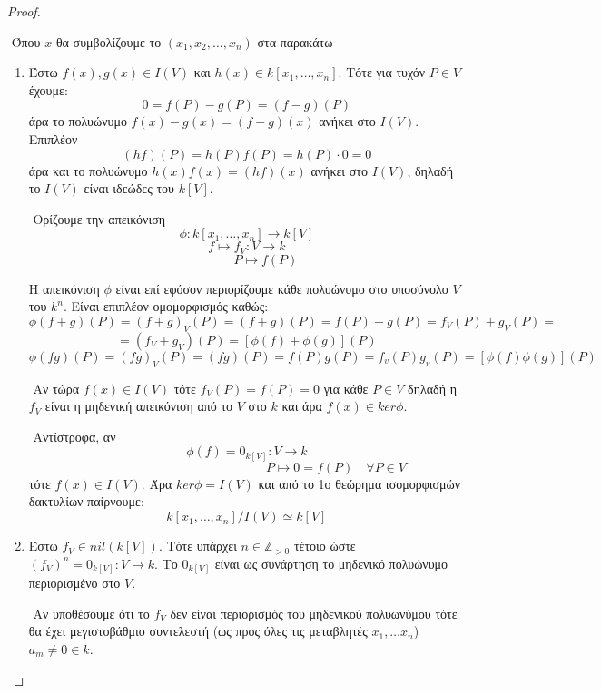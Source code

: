 \documentclass[oneside,a4paper]{article}
\newcommand{\Z}{\mathbb{Z}}
\begin{document}
\begin{proof} $ $
	
	$ $\newline
	Όπου $x$ θα συμβολίζουμε το $(x_1, x_2, \ldots, x_n)$ στα παρακάτω
	\begin{enumerate}
		\item Έστω $f(x),g(x) \in I(V)$ και $h(x) \in k[x_1,\ldots ,x_n]$. Τότε για τυχόν $P \in V$ έχουμε:
		$$0 = f(P) - g(P) = (f-g)(P)$$
		άρα το πολυώνυμο $f(x)-g(x) = (f-g)(x)$ ανήκει στο $I(V)$. Επιπλέον
		$$(hf)(P) = h(P)f(P) = h(P)\cdot 0 = 0$$
		άρα και το πολυώνυμο $h(x)f(x) = (hf)(x)$ ανήκει στο $I(V)$, δηλαδή το $I(V)$ είναι ιδεώδες του $k[V]$.

		$ $\newline
		Ορίζουμε την απεικόνιση
		$$\phi : k[x_1, \ldots, x_n] \longrightarrow k[V]$$
		$$f \longmapsto f_V:V\rightarrow k$$
		$$\quad \quad \quad P\mapsto f(P)$$

		Η απεικόνιση $\phi$ είναι επί εφόσον περιορίζουμε κάθε πολυώνυμο στο υποσύνολο $V$ του $k^n$. Είναι επιπλέον ομομορφισμός καθώς:
		$$\phi(f+g)(P) = (f+g)_V (P) = (f+g)(P) = f(P) + g(P) = f_V (P) + g_V (P) =$$
		$$ = (f_V + g_V) (P) = [\phi(f) + \phi(g)](P)$$
		$$\phi(fg) (P)= (fg)_V (P) = (fg)(P) = f(P)g(P) = f_v(P) g_v(P) = [\phi(f)\phi(g)](P)$$
		
		$ $\newline
		Αν τώρα $f(x) \in I(V)$ τότε $f_V (P) = f(P) = 0$ για κάθε $P \in V$ δηλαδή η $f_V$ είναι η μηδενική απεικόνιση από το $V$ στο $k$ και άρα $f(x) \in ker\phi$.
		
		$ $\newline
		Αντίστροφα, αν
		$$\phi(f) = 0_{k[V]} : V \rightarrow k$$
		$$\quad \quad \quad \quad \quad  \quad \quad \quad \quad  \quad \quad \quad \quad \quad P \mapsto 0 = f(P) \quad \forall P \in V$$
		τότε $f(x) \in I(V)$. Άρα $ker\phi = I(V)$ και από το 1ο θεώρημα ισομορφισμών δακτυλίων παίρνουμε:
		$$ k[x_1, \ldots , x_n ] / I(V) \simeq k[V]$$

		\item Έστω $f_V \in nil(k[V])$. Τότε υπάρχει $n \in \Z_{>0}$ τέτοιο ώστε $(f_V)^n = 0_{k[V]} : V \rightarrow k$. Το $0_{k[V]}$ είναι ως συνάρτηση το μηδενικό πολυώνυμο περιορισμένο στο $V$. 
		
		$ $\newline
		Αν υποθέσουμε ότι το $f_V$ δεν είναι περιορισμός του μηδενικού πολυωνύμου τότε θα έχει μεγιστοβάθμιο συντελεστή (ως προς όλες τις μεταβλητές $x_1,\ldots x_n$) $a_m \neq 0  \in k$.
		

\end{enumerate}
\end{proof}
\end{document}
